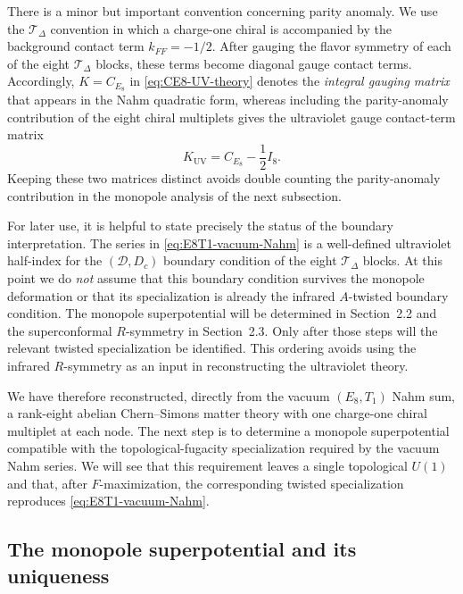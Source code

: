 \documentclass[11pt,a4paper]{article}
\numberwithin{equation}{section}
\begin{document}
There is a minor but important convention concerning parity anomaly.  We use the $\mathcal T_\Delta$ convention in which a charge-one chiral is accompanied by the background contact term $k_{FF}=-1/2$.  After gauging the flavor symmetry of each of the eight $\mathcal T_\Delta$ blocks, these terms become diagonal gauge contact terms.  Accordingly, $K=C_{E_8}$ in \eqref{eq:CE8-UV-theory} denotes the \emph{integral gauging matrix} that appears in the Nahm quadratic form, whereas including the parity-anomaly contribution of the eight chiral multiplets gives the ultraviolet gauge contact-term matrix
\begin{equation}
  K_{\mathrm{UV}}
  =C_{E_8}-\frac12 I_8.
  \label{eq:CE8-UV-level}
\end{equation}
Keeping these two matrices distinct avoids double counting the parity-anomaly contribution in the monopole analysis of the next subsection.

For later use, it is helpful to state precisely the status of the boundary interpretation.  The series in \eqref{eq:E8T1-vacuum-Nahm} is a well-defined ultraviolet half-index for the $(\mathcal D,D_c)$ boundary condition of the eight $\mathcal T_\Delta$ blocks.  At this point we do \emph{not} assume that this boundary condition survives the monopole deformation or that its specialization is already the infrared $A$-twisted boundary condition.  The monopole superpotential will be determined in Section~2.2 and the superconformal $R$-symmetry in Section~2.3.  Only after those steps will the relevant twisted specialization be identified.  This ordering avoids using the infrared $R$-symmetry as an input in reconstructing the ultraviolet theory.

We have therefore reconstructed, directly from the vacuum $(E_8,T_1)$ Nahm sum, a rank-eight abelian Chern--Simons matter theory with one charge-one chiral multiplet at each node.  The next step is to determine a monopole superpotential compatible with the topological-fugacity specialization required by the vacuum Nahm series.  We will see that this requirement leaves a single topological $U(1)$ and that, after $F$-maximization, the corresponding twisted specialization reproduces \eqref{eq:E8T1-vacuum-Nahm}.



\subsection{The monopole superpotential and its uniqueness}
\label{subsec:monopole-superpotential}
\end{document}
